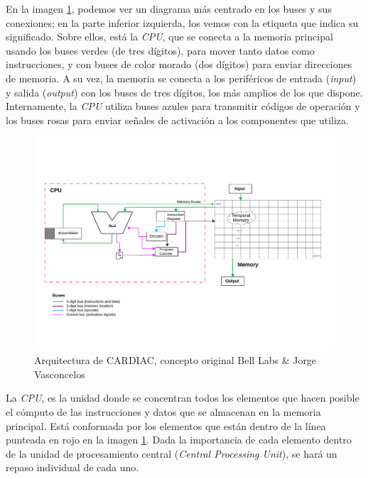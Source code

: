\documentclass[letterpaper,12pt,oneside]{book}
\begin{document}

	En la imagen \ref{fig:Arquitectura_diagrama_original}, podemos ver un diagrama
	más centrado en los buses y sus conexiones; en la parte inferior izquierda, 
	los vemos con la etiqueta que indica su significado. Sobre ellos, está la \textit{CPU},
	que se conecta a la memoria principal usando los 
	buses verdes (de tres dígitos),
	para mover tanto datos como instrucciones, y
	con buses de color morado (dos dígitos) para enviar direcciones de memoria. A su vez, 
	la memoria se conecta a los periféricos de entrada (\textit{input})
	y salida (\textit{output}) con los buses de tres dígitos, los más amplios de los que dispone.
	Internamente, la \textit{CPU} utiliza buses azules para transmitir
	códigos de operación y los buses rosas para enviar señales de activación
	a los componentes que utiliza.	
	
	\begin{figure}[ht]
 			\centering
			\includegraphics[scale=0.5]{media/CARDIACC/Arquitectura_diagrama_original_100celdas.pdf}
			\caption{Arquitectura de CARDIAC, concepto original Bell Labs \& Jorge Vasconcelos}
			\label{fig:Arquitectura_diagrama_original}
	\end{figure}
	
	
	
	La \textit{CPU}, es la unidad donde se concentran todos los elementos que hacen 
	posible el cómputo de las instrucciones y datos
	que se almacenan en la memoria principal.
	Está conformada por los elementos que están dentro de la línea punteada en rojo en la imagen
	 \ref{fig:Arquitectura_diagrama_original}. Dada la importancia
	de cada elemento dentro de la unidad de procesamiento central (\textit{Central Processing Unit}),
	se hará un repaso individual de cada uno.
	
\end{document}
